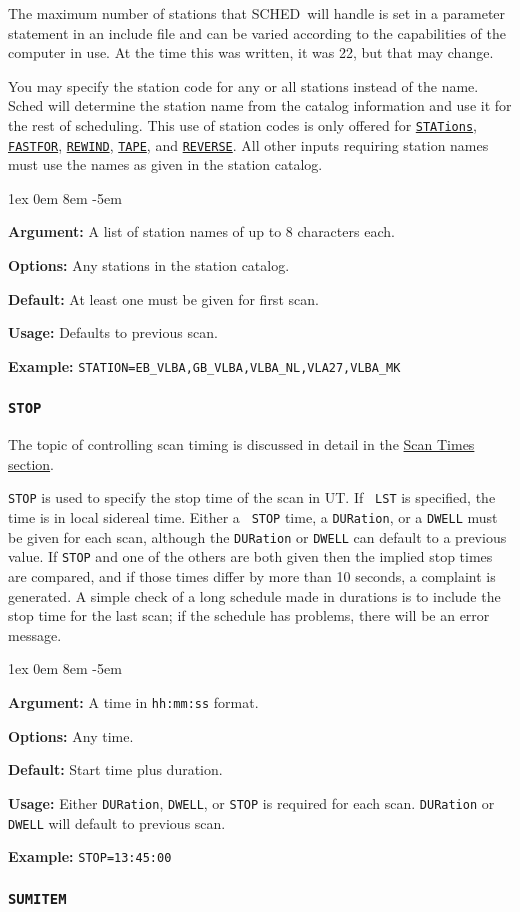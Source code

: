 \documentclass{report}
\newcommand{\schedb}{{\sc SCHED~}}
\newcommand{\rcwbox}[5]{
  \begin{list}{}{\parsep 1ex  \itemsep 0em
                 \leftmargin 8em  \itemindent -5em }
    \item {\bf Argument:} #1
    \item {\bf Options:}  #2
    \item {\bf Default:}  #3
    \item {\bf Usage:}    #4
    \item {\bf Example:}  #5
  \end{list}
}
\begin{document}
The maximum number of stations that \schedb will handle is set
in a parameter statement in an include file and can be varied according
to the capabilities of the computer in use.  At the time this was
written, it was 22, but that may change.

You may specify the station code for any or all stations instead of
the name.  Sched will determine the station name from the catalog
information and use it for the rest of scheduling.  This use of
station codes is only offered for 
{\hyperref[MP:STATIONS]{{\tt STATions}}},
{\hyperref[MP:FASTFOR]{{\tt FASTFOR}}}, 
{\hyperref[MP:REWIND]{{\tt REWIND}}},
{\hyperref[MP:TAPE]{{\tt TAPE}}}, and 
{\hyperref[MP:REVERSE]{{\tt REVERSE}}}.
All other inputs requiring station names must use the names as given
in the station catalog.

\rcwbox
{A list of station names of up to 8 characters each.}
{Any stations in the station catalog.}
{At least one must be given for first scan.}
{Defaults to previous scan.}
{{\tt STATION=EB\_VLBA,GB\_VLBA,VLBA\_NL,VLA27,VLBA\_MK}}


\subsubsection{\label{MP:STOP}{\tt STOP}}

The topic of controlling scan timing is discussed in detail in
the 
{\hyperref[SSEC:SCANTIMES]{Scan Times section}}.

{\tt STOP} is used to specify the stop time of the scan in UT. If {\tt
LST} is specified, the time is in local sidereal time. Either a {\tt
STOP} time, a {\tt DURation}, or a {\tt DWELL} must be given for each
scan, although the {\tt DURation} or {\tt DWELL} can default to a
previous value. If {\tt STOP} and one of the others are both given
then the implied stop times are compared, and if those times differ by
more than 10 seconds, a complaint is generated. A simple check of
a long schedule made in durations is to include the stop time for the
last scan; if the schedule has problems, there will be an error
message.

\rcwbox
{A time in {\tt hh:mm:ss} format.}
{Any time.}
{Start time plus duration.}
{Either {\tt DURation}, {\tt DWELL}, or {\tt STOP} is required for
each scan. {\tt DURation} or {\tt DWELL} will default to previous scan.}
{{\tt STOP=13:45:00}}

\subsubsection{\label{MP:SUMITEM}{\tt SUMITEM}}
\end{document}

